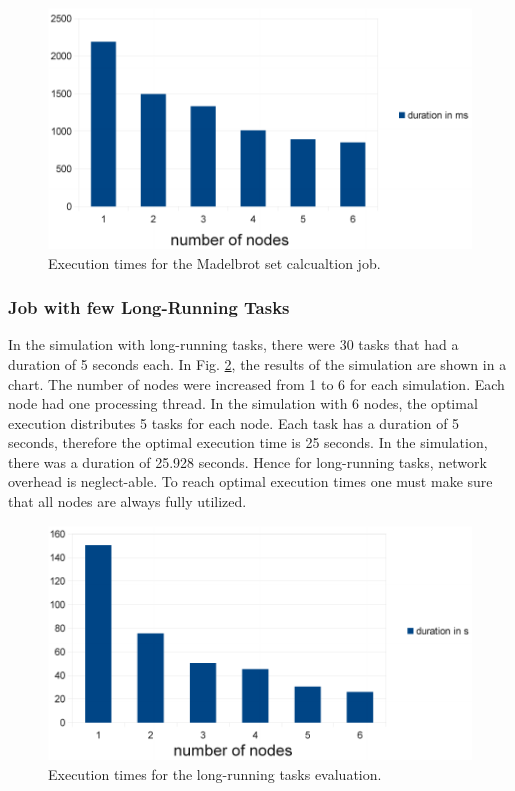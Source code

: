 \documentclass[english]{uzhpub}
\begin{document}
\begin{figure}[h]
\centering
\includegraphics[scale=0.7]{images/amazon-duration.pdf}
\caption{Execution times for the Madelbrot set calcualtion job.}
\label{fig:times-mandelbrot}
\end{figure}

\subsubsection{Job with few Long-Running Tasks}

In the simulation with long-running tasks, there were 30 tasks that had a duration of 5 seconds each. In Fig. \ref{fig:evaluation-long-running}, the results of the simulation are shown in a chart. The number of nodes were increased from 1 to 6 for each simulation. Each node had one processing thread. In the simulation with 6 nodes, the optimal execution distributes 5 tasks for each node. Each task has a duration of 5 seconds, therefore the optimal execution time is 25 seconds. In the simulation, there was a duration of 25.928 seconds. Hence for long-running tasks, network overhead is neglect-able. To reach optimal execution times one must make sure that all nodes are always fully utilized.

\begin{figure}[h]
\centering
\includegraphics[scale=0.7]{images/long-running-duration.pdf}
\caption{Execution times for the long-running tasks evaluation.}
\label{fig:evaluation-long-running}
\end{figure}
\end{document}
